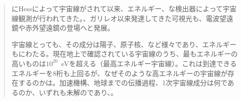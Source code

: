 \begin{quotation}
\DIFdelbegin {}\DIFdelend \DIFaddbegin {}\DIFaddend \DIFdelbegin {}\DIFdelend \DIFaddbegin {}\DIFaddend に\DIFaddbegin \DIFaddend Hess\DIFdelbegin {}\DIFdelend によって宇宙線\DIFdelbegin {}\DIFdelend が\DIFdelbegin {}\DIFdelend \DIFaddbegin {}\DIFaddend されて以来、\DIFdelbegin {}\DIFdelend \DIFaddbegin {}\DIFaddend エネルギー\DIFdelbegin {}\DIFdelend \DIFaddbegin {}\DIFaddend 、\DIFdelbegin {}\DIFdelend \DIFaddbegin {}\DIFaddend な検出器によって宇宙線\DIFdelbegin {}\DIFdelend \DIFaddbegin \DIFaddend 観測が行われてきた。\DIFdelbegin {}\DIFdelend \DIFaddbegin {}\DIFaddend 、ガリレオ以来発達してきた可視光\DIFdelbegin {}\DIFdelend \DIFaddbegin {}\DIFaddend も、電波望遠鏡や赤外望遠鏡\DIFaddbegin {}\DIFaddend の登場\DIFdelbegin {}\DIFdelend \DIFaddbegin {}\DIFaddend へと発展\DIFdelbegin {}\DIFdelend \DIFaddbegin {}\DIFaddend 。

宇宙線と\DIFdelbegin {}\DIFdelend \DIFaddbegin {}\DIFaddend っても、その成分は\DIFdelbegin {}\DIFdelend 陽子、原子核、\DIFdelbegin {}\DIFdelend \DIFaddbegin {}\DIFaddend など様々であり、\DIFdelbegin {}\DIFdelend \DIFaddbegin {}\DIFaddend エネルギー\DIFaddbegin {}\DIFaddend も\DIFdelbegin {}\DIFdelend \DIFaddbegin {}\DIFaddend に\DIFaddbegin {}\DIFaddend わたる。現在\DIFdelbegin \DIFdelend \DIFaddbegin {}\DIFaddend 地\DIFdelbegin {}\DIFdelend 上で確認されている宇宙線のうち、最もエネルギーの高いものは$10^{20}$~eVを超える（\DIFaddbegin {}\DIFaddend 最高エネルギー宇宙線）。これは\DIFdelbegin {}\DIFdelend \DIFaddbegin {}\DIFaddend 到達できるエネルギーを\DIFdelbegin {}\DIFdelend 8桁も上回るが、なぜそのような高\DIFaddbegin {}\DIFaddend エネルギーの宇宙線が存在するのかは\DIFdelbegin {}\DIFdelend \DIFaddbegin {}\DIFaddend 。\DIFaddbegin {}\DIFaddend 加速機構、地球までの伝播過程、\DIFaddbegin {}\DIFaddend 1次宇宙線成分は何であるのか\DIFaddbegin {}\DIFaddend 、いずれも未解\DIFdelbegin {}\DIFdelend \DIFaddbegin {}\DIFaddend の\DIFdelbegin {}\DIFdelend \DIFaddbegin {}\DIFaddend であり、\DIFdelbegin {}\DIFdelend \DIFaddbegin {}\DIFaddend 。
\end{quotation}

